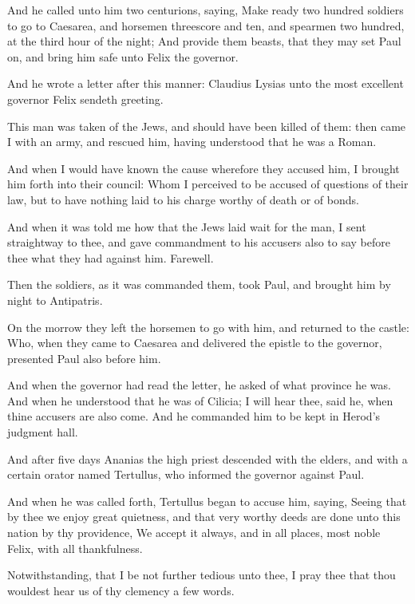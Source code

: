 \Verse And he called unto him two centurions, saying, Make ready two hundred soldiers to go to Caesarea, and horsemen threescore and ten, and spearmen two hundred, at the third hour of the night; \Verse And provide them beasts, that they may set Paul on, and bring him safe unto Felix the governor.

\Verse And he wrote a letter after this manner: \Verse Claudius Lysias unto the most excellent governor Felix sendeth greeting.

\Verse This man was taken of the Jews, and should have been killed of them: then came I with an army, and rescued him, having understood that he was a Roman.

\Verse And when I would have known the cause wherefore they accused him, I brought him forth into their council: \Verse Whom I perceived to be accused of questions of their law, but to have nothing laid to his charge worthy of death or of bonds.

\Verse And when it was told me how that the Jews laid wait for the man, I sent straightway to thee, and gave commandment to his accusers also to say before thee what they had against him. Farewell.

\Verse Then the soldiers, as it was commanded them, took Paul, and brought him by night to Antipatris.

\Verse On the morrow they left the horsemen to go with him, and returned to the castle: \Verse Who, when they came to Caesarea and delivered the epistle to the governor, presented Paul also before him.

\Verse And when the governor had read the letter, he asked of what province he was. And when he understood that he was of Cilicia; \Verse I will hear thee, said he, when thine accusers are also come. And he commanded him to be kept in Herod's judgment hall.


\Chapter
\Verse And after five days Ananias the high priest descended with the elders, and with a certain orator named Tertullus, who informed the governor against Paul.

\Verse And when he was called forth, Tertullus began to accuse him, saying, Seeing that by thee we enjoy great quietness, and that very worthy deeds are done unto this nation by thy providence, \Verse We accept it always, and in all places, most noble Felix, with all thankfulness.

\Verse Notwithstanding, that I be not further tedious unto thee, I pray thee that thou wouldest hear us of thy clemency a few words.

